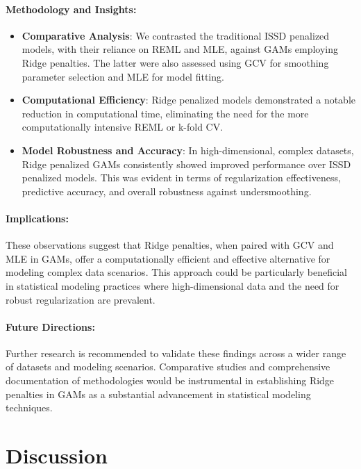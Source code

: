 \documentclass[12pt, twoside,hidelinks]{article}
\theoremstyle{definition}
\numberwithin{equation}{section}
\begin{document}
\paragraph{Methodology and Insights:}
\begin{itemize}
\item \textbf{Comparative Analysis}: We contrasted the traditional ISSD penalized models, with their reliance on REML and MLE, against GAMs employing Ridge penalties. The latter were also assessed using GCV for smoothing parameter selection and MLE for model fitting.
\item \textbf{Computational Efficiency}: Ridge penalized models demonstrated a notable reduction in computational time, eliminating the need for the more computationally intensive REML or k-fold CV.
\item \textbf{Model Robustness and Accuracy}: In high-dimensional, complex datasets, Ridge penalized GAMs consistently showed improved performance over ISSD penalized models. This was evident in terms of regularization effectiveness, predictive accuracy, and overall robustness against undersmoothing.
\end{itemize}

\paragraph{Implications:}
These observations suggest that Ridge penalties, when paired with GCV and MLE in GAMs, offer a computationally efficient and effective alternative for modeling complex data scenarios. This approach could be particularly beneficial in statistical modeling practices where high-dimensional data and the need for robust regularization are prevalent.

\paragraph{Future Directions:}
Further research is recommended to validate these findings across a wider range of datasets and modeling scenarios. Comparative studies and comprehensive documentation of methodologies would be instrumental in establishing Ridge penalties in GAMs as a substantial advancement in statistical modeling techniques.

\newpage


\section{Discussion}
\end{document}
